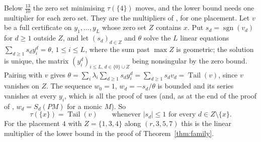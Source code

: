 \documentclass[11pt]{article}
\DeclareMathOperator{\Tail}{Tail}
\DeclareMathOperator{\sgn}{sgn}
\begin{document}
Below $\tfrac{13}{10}$ the zero set minimising $\tau(\{4\})$ moves, and the
lower bound needs one multiplier for each zero set.  They are the
multipliers of \cite[Proposition~3.2]{coefficient-mass-attainment}, for one placement.  Let $v$
be a full certificate on $y_1,\ldots,y_L$ whose zero set $Z$ contains $x$.
Put $s_d=\sgn(v_d)$ for $d\ge1$ outside $Z$, and let $(s_d)_{d\in Z}$ and
$\theta$ solve the $L$ linear equations $\sum_{d\ge1}s_dy_i^d=\theta$,
$1\le i\le L$, where the sum past $\max Z$ is geometric; the solution is
unique, the matrix $(y_i^d)_{i\le L,\,d\in\{0\}\cup Z}$ being nonsingular by
the zero bound.  Pairing with $v$
gives $\theta=\sum_i\lambda_i\sum_{d\ge1}s_dy_i^d=\sum_{d\ge1}s_dv_d=\Tail(v)$,
since $v$ vanishes on $Z$.  The sequence $w_0=1$, $w_d=-s_d/\theta$ is
bounded and its series vanishes at every $y_i$, which is all the proof of
\cite[Lemma~5.1]{coefficient-mass-attainment} uses (and, as at the end of the proof of
\cite[Proposition~3.2]{coefficient-mass-attainment}, $w_d=S_d(PM)$ for a monic $M$).  So
\begin{equation}\label{eq:witness}
  \tau(\{x\})=\Tail(v)\qquad\text{whenever }|s_d|\le1\text{ for every }
  d\in Z\setminus\{x\}.
\end{equation}
For the placement $4$ with $Z=\{1,3,4\}$ along $(r,3,5,7)$ this is the
linear multiplier of the lower bound in the proof of
Theorem~\ref{thm:family}.
\end{document}

